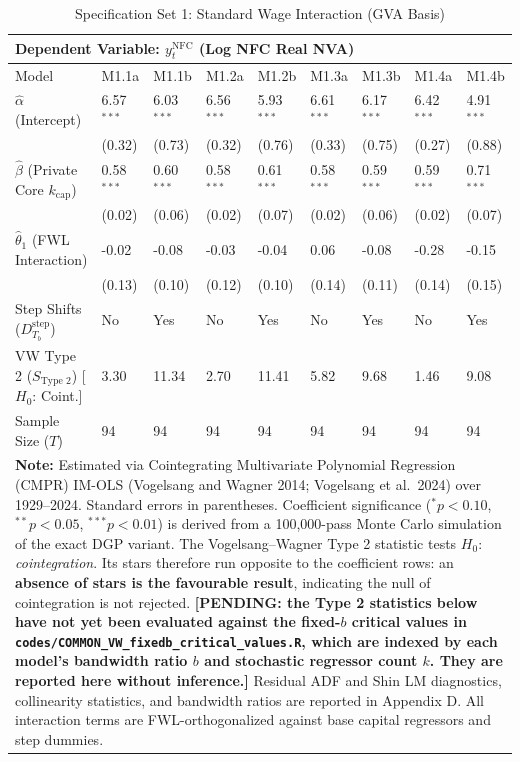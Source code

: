 \begin{table}[H]
\centering
\setlength{\tabcolsep}{2.5pt}
\caption{Specification Set 1: Standard Wage Interaction (GVA Basis)}
\label{tab:specA_set1_gva_core}
\scriptsize
\begin{tabular}{p{3.8cm}p{1.1cm}p{1.1cm}p{1.1cm}p{1.1cm}p{1.1cm}p{1.1cm}p{1.1cm}p{1.1cm}}
\toprule
\multicolumn{9}{l}{\textbf{Dependent Variable: $y_t^{\text{NFC}}$ (Log NFC Real NVA)}} \\
\midrule
Model & M1.1a & M1.1b & M1.2a & M1.2b & M1.3a & M1.3b & M1.4a & M1.4b \\
\midrule
$\hat{\alpha}$ (Intercept) & 6.57$^{***}$ & 6.03$^{***}$ & 6.56$^{***}$ & 5.93$^{***}$ & 6.61$^{***}$ & 6.17$^{***}$ & 6.42$^{***}$ & 4.91$^{***}$ \\
 & (0.32) & (0.73) & (0.32) & (0.76) & (0.33) & (0.75) & (0.27) & (0.88) \\
$\hat{\beta}$ (Private Core $k_{\text{cap}}$) & 0.58$^{***}$ & 0.60$^{***}$ & 0.58$^{***}$ & 0.61$^{***}$ & 0.58$^{***}$ & 0.59$^{***}$ & 0.59$^{***}$ & 0.71$^{***}$ \\
 & (0.02) & (0.06) & (0.02) & (0.07) & (0.02) & (0.06) & (0.02) & (0.07) \\
$\hat{\theta}_1$ (FWL Interaction) & -0.02 & -0.08 & -0.03 & -0.04 & 0.06 & -0.08 & -0.28 & -0.15 \\
 & (0.13) & (0.10) & (0.12) & (0.10) & (0.14) & (0.11) & (0.14) & (0.15) \\
Step Shifts ($D_{T_b}^{\text{step}}$) & No & Yes & No & Yes & No & Yes & No & Yes \\
\midrule
VW Type 2 ($S_{\text{Type 2}}$) [$H_0$: Coint.] & 3.30 & 11.34 & 2.70 & 11.41 & 5.82 & 9.68 & 1.46 & 9.08 \\
\midrule
Sample Size ($T$) & 94 & 94 & 94 & 94 & 94 & 94 & 94 & 94 \\
\bottomrule
\multicolumn{9}{p{14.5cm}}{\footnotesize \textbf{Note:} Estimated via Cointegrating Multivariate Polynomial Regression (CMPR) IM-OLS (Vogelsang and Wagner 2014; Vogelsang et al.\ 2024) over 1929--2024. Standard errors in parentheses. Coefficient significance ($^* p < 0.10$, $^{**} p < 0.05$, $^{***} p < 0.01$) is derived from a 100,000-pass Monte Carlo simulation of the exact DGP variant. The Vogelsang--Wagner Type 2 statistic tests $H_0$: \emph{cointegration}. Its stars therefore run opposite to the coefficient rows: an \textbf{absence of stars is the favourable result}, indicating the null of cointegration is not rejected. \textbf{[PENDING: the Type 2 statistics below have not yet been evaluated against the fixed-$b$ critical values in \texttt{codes/COMMON\_VW\_fixedb\_critical\_values.R}, which are indexed by each model's bandwidth ratio $b$ and stochastic regressor count $k$. They are reported here without inference.]} Residual ADF and Shin LM diagnostics, collinearity statistics, and bandwidth ratios are reported in Appendix D. All interaction terms are FWL-orthogonalized against base capital regressors and step dummies.} \\
\end{tabular}
\end{table}
